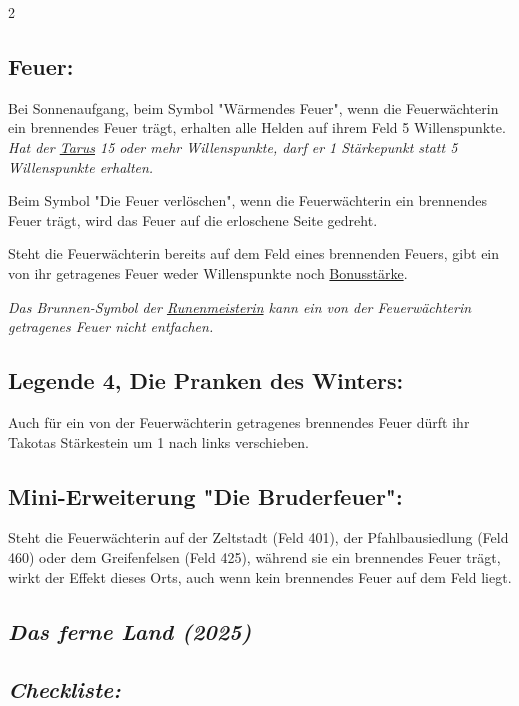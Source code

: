 \documentclass[10pt, a4paper, oneside]{book}
\newcommand{\fan}[1]{\textit{#1}}
\begin{document}
\begin{multicols*}{2}
\begin{bgcolor}
\subsection{Feuer:}
Bei Sonnenaufgang, beim Symbol "Wärmendes Feuer", wenn die Feuerwächterin ein brennendes Feuer trägt, erhalten alle Helden auf ihrem Feld 5 Willenspunkte.
\supercite{DeK:Begleitheft} 
\fan{Hat der \hyperref[Tarus]{Tarus} 15 oder mehr Willenspunkte, darf er 1 Stärkepunkt statt 5 Willenspunkte erhalten.}  

Beim Symbol "Die Feuer verlöschen", wenn die Feuerwächterin ein brennendes Feuer trägt, wird das Feuer auf die erloschene Seite gedreht. 

Steht die Feuerwächterin bereits auf dem Feld eines brennenden Feuers, gibt ein von ihr getragenes Feuer weder Willenspunkte noch \hyperref[Bonusstärke]{Bonusstärke}.
\supercite{101489}

\fan{Das Brunnen-Symbol der \hyperref[Runenmeisterin]{Runenmeisterin} kann ein von der Feuerwächterin getragenes Feuer nicht entfachen.}



\subsection{Legende 4, Die Pranken des Winters:}

Auch für ein von der Feuerwächterin getragenes brennendes Feuer dürft ihr Takotas Stärkestein um 1 nach links verschieben.
\supercite{DeK4:Takota}


\subsection{Mini-Erweiterung "Die Bruderfeuer":}


Steht die Feuerwächterin auf der Zeltstadt (Feld 401), der Pfahlbausiedlung (Feld 460) oder dem Greifenfelsen (Feld 425), während sie ein brennendes Feuer trägt, wirkt der Effekt dieses Orts, auch wenn kein brennendes Feuer auf dem Feld liegt.
\supercite{ME:Bruderfeuer}

\end{bgcolor}


\begin{bgcolor}
\section{\fan{Das ferne Land (2025)}}


\subsection{\fan{Checkliste:}}


\end{bgcolor}
\end{multicols*}
\end{document}

